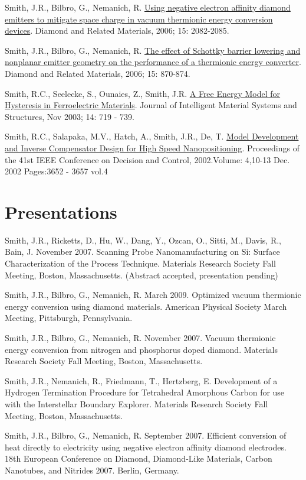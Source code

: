 \documentclass[letterpaper,margin,line]{res}
\begin{document}
\begin{resume}
Smith, J.R., Bilbro, G., Nemanich, R. \href{http://dx.doi.org/10.1016/j.diamond.2006.09.011}{Using negative electron affinity diamond emitters to mitigate space charge in vacuum thermionic energy conversion devices}. Diamond and Related Materials, 2006; 15: 2082-2085.

Smith, J.R., Bilbro, G., Nemanich, R. \href{http://dx.doi.org/10.1016/j.diamond.2005.12.057}{The effect of Schottky barrier lowering and nonplanar emitter geometry on the performance of a thermionic energy converter}. Diamond and Related Materials, 2006; 15: 870-874.

Smith, R.C., Seelecke, S., Ounaies, Z., Smith, J.R. \href{http://dx.doi.org/10.1177/1045389X03038841}{A Free Energy Model for Hysteresis in Ferroelectric Materials}. Journal of Intelligent Material Systems and Structures, Nov 2003;  14:  719 - 739.

Smith, R.C., Salapaka, M.V., Hatch, A., Smith, J.R., De, T. \href{http://dx.doi.org/10.1109/CDC.2002.1184930}{Model Development and Inverse Compensator Design for High Speed Nanopositioning}. Proceedings of the 41st IEEE Conference on Decision and Control, 2002.Volume: 4,10-13 Dec. 2002 Pages:3652  - 3657 vol.4


\section{\sc Presentations}
Smith, J.R., Ricketts, D., Hu, W., Dang, Y., Ozcan, O., Sitti, M., Davis, R., Bain, J. November 2007. Scanning Probe Nanomanufacturing on Si: Surface Characterization of the Process Technique. Materials Research Society Fall Meeting, Boston, Massachusetts. (Abstract accepted, presentation pending)

Smith, J.R., Bilbro, G., Nemanich, R. March 2009. Optimized vacuum thermionic energy conversion using diamond materials. American Physical Society March Meeting, Pittsburgh, Pennsylvania.

Smith, J.R., Bilbro, G., Nemanich, R. November 2007. Vacuum thermionic energy conversion from nitrogen and phosphorus doped diamond. Materials Research Society Fall Meeting, Boston, Massachusetts.

Smith, J.R., Nemanich, R., Friedmann, T., Hertzberg, E. Development of a Hydrogen Termination Procedure for Tetrahedral Amorphous Carbon for use with the Interstellar Boundary Explorer. Materials Research Society Fall Meeting, Boston, Massachusetts.

Smith, J.R., Bilbro, G., Nemanich, R. September 2007. Efficient conversion of heat directly to electricity using negative electron affinity diamond electrodes. 18th European Conference on Diamond, Diamond-Like Materials, Carbon Nanotubes, and Nitrides 2007. Berlin, Germany.


\end{resume}
\end{document}
